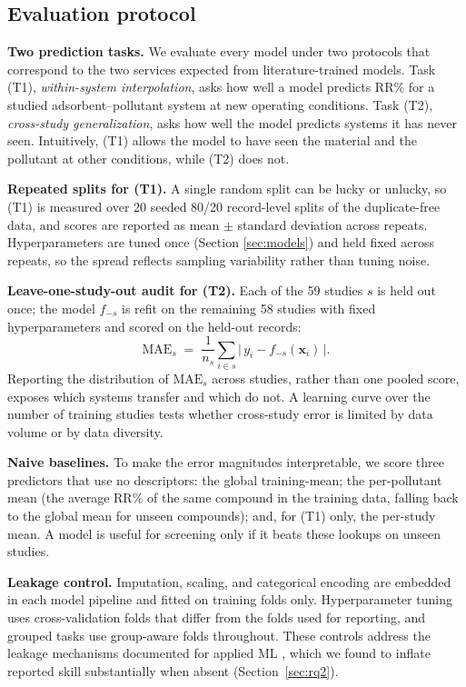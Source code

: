 \subsection{Evaluation protocol}
\label{sec:protocol}

\textbf{Two prediction tasks.} We evaluate every model under two
protocols that correspond to the two services expected from
literature-trained models. Task (T1), \emph{within-system interpolation},
asks how well a model predicts RR\% for a studied
adsorbent--pollutant system at new operating conditions. Task (T2),
\emph{cross-study generalization}, asks how well the model predicts
systems it has never seen. Intuitively, (T1) allows the model to have
seen the material and the pollutant at other conditions, while (T2) does
not.

\textbf{Repeated splits for (T1).} A single random split can be lucky or
unlucky, so (T1) is measured over 20 seeded 80/20 record-level splits of
the duplicate-free data, and scores are reported as mean $\pm$ standard
deviation across repeats. Hyperparameters are tuned once (Section
\ref{sec:models}) and held fixed across repeats, so the spread reflects
sampling variability rather than tuning noise.

\textbf{Leave-one-study-out audit for (T2).} Each of the 59 studies $s$
is held out once; the model $f_{-s}$ is refit on the remaining 58
studies with fixed hyperparameters and scored on the held-out records:
\begin{equation}
\mathrm{MAE}_s \;=\; \frac{1}{n_s}\sum_{i \in s}
\bigl|\, y_i - f_{-s}(\mathbf{x}_i) \,\bigr| .
\label{eq:loso}
\end{equation}
Reporting the distribution of $\mathrm{MAE}_s$ across studies, rather
than one pooled score, exposes which systems transfer and which do not.
A learning curve over the number of training studies tests whether
cross-study error is limited by data volume or by data diversity.

\textbf{Naive baselines.} To make the error magnitudes interpretable, we
score three predictors that use no descriptors: the global training-mean;
the per-pollutant mean (the average RR\% of the same compound in the
training data, falling back to the global mean for unseen compounds); and,
for (T1) only, the per-study mean. A model is useful for screening only
if it beats these lookups on unseen studies.

\textbf{Leakage control.} Imputation, scaling, and categorical encoding
are embedded in each model pipeline and fitted on training folds only.
Hyperparameter tuning uses cross-validation folds that differ from the
folds used for reporting, and grouped tasks use group-aware folds
throughout. These controls address the leakage mechanisms documented for
applied ML \citep{kapoor2023leakage}, which we found to inflate reported
skill substantially when absent (Section~\ref{sec:rq2}).


